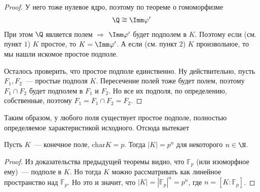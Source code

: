 \begin{proof}
    У него тоже нулевое ядро, поэтому по теореме о гомоморфизме
    \begin{gather*}
        \Q \cong \Imm \varphi'
    \end{gather*}
    При этом $\Q$ является полем $\Rightarrow$ $\Imm \varphi'$ будет подполем в $K$.
    Поэтому если (см. пункт $1$) $K$ простое, то $K=\Imm \varphi'$.
    А если (см. пункт $2$) $K$ произвольное, то мы нашли искомое простое подполе.\medskip

    Осталось проверить, что простое подполе единственно.
    Ну действительно, пусть $F_1, F_2$~--- простые подполя $K$.
    Пересечение полей тоже будет полем, поэтому $F_1 \cap F_2$ будет подполем в $F_1$ и $F_2$.
    Но все их подполя, по определению, собственные, поэтому $F_1 = F_1 \cap F_2 = F_2$.
\end{proof}

Таким образом, у любого поля существует простое подполе, полностью определяемое характеристикой исходного.
Отсюда вытекает

\follow Пусть $K$~--- конечное поле, $\text{char} K = p$. Тогда $|K|=p^n$ для некоторого $n\in\N$.
\begin{proof}
    Из доказательства предыдущей теоремы видно, что $\mathbb{F}_p$ (или изоморфное ему)~--- подполе в $K$.
    Но тогда $K$ можно рассматривать как линейное пространство над $\mathbb{F}_p$.
    Но это и значит, что $|K|=|\mathbb{F}_p|^n=p^n$, где $n = [K:\mathbb{F}_p]$.
\end{proof}